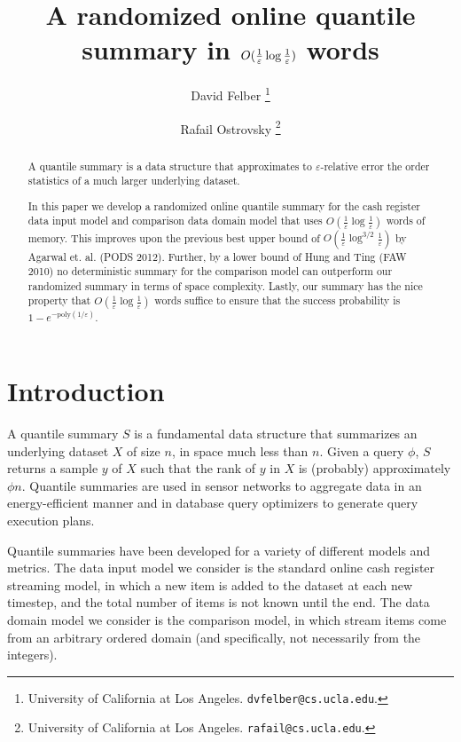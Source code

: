 \documentclass{article}
\title{A randomized online quantile summary in $\OO{\frac{1}{\ep} \log \frac{1}{\ep}}$ words}
\author{
David Felber
\thanks{University of California at Los Angeles. \texttt{dvfelber@cs.ucla.edu}.}
\and
Rafail Ostrovsky
\thanks{University of California at Los Angeles. \texttt{rafail@cs.ucla.edu}.}
}
\date{}
\theoremstyle{plain}
\def\ep{\varepsilon}
\newcommand{\p}[1]{(#1)}
\newcommand{\OO}[1]{O\p{#1}}
\newcommand{\poly}[1]{\text{poly}\p{#1}}
\begin{document}
\maketitle

\begin{abstract}

  A quantile summary is a data structure that approximates to $\ep$-relative
  error the order statistics of a much larger underlying dataset.

  In this paper we develop a randomized online quantile summary for the cash
  register data input model and comparison data domain model that uses
  $\OO{\frac{1}{\ep} \log \frac{1}{\ep}}$ words of memory. This improves upon
  the previous best upper bound of $\OO{\frac{1}{\ep} \log^{3/2} \frac{1}{\ep}}$
  by Agarwal et. al. (PODS 2012). Further, by a lower bound of Hung and Ting
  (FAW 2010) no deterministic summary for the comparison model can outperform
  our randomized summary in terms of space complexity. Lastly, our summary has
  the nice property that $\OO{\frac{1}{\ep} \log \frac{1}{\ep}}$ words suffice
  to ensure that the success probability is $1 - e^{-\poly{1/\ep}}$.

\end{abstract}
 
\section{Introduction}
\label{sec:introduction}

A quantile summary $S$ is a fundamental data structure that summarizes an
underlying dataset $X$ of size $n$, in space much less than $n$. Given a query
$\phi$, $S$ returns a sample $y$ of $X$ such that the rank of $y$ in $X$ is
(probably) approximately $\phi n$. Quantile summaries are used in sensor
networks to aggregate data in an energy-efficient manner and in database query
optimizers to generate query execution plans.

Quantile summaries have been developed for a variety of different models and
metrics. The data input model we consider is the standard online cash register
streaming model, in which a new item is added to the dataset at each new
timestep, and the total number of items is not known until the end. The data
domain model we consider is the comparison model, in which stream items come
from an arbitrary ordered domain (and specifically, not necessarily from the
integers).
\end{document}
